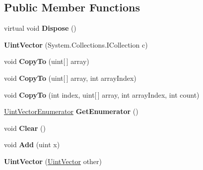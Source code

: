 \subsection*{Public Member Functions}
\begin{DoxyCompactItemize}
\item 
\hypertarget{class_uint_vector_a68c1c1a9371e689f7304576a81c1d51b}{virtual void {\bfseries Dispose} ()}\label{class_uint_vector_a68c1c1a9371e689f7304576a81c1d51b}

\item 
\hypertarget{class_uint_vector_a1abe5eda4417f2b849b5ac9a81bb95e0}{{\bfseries Uint\+Vector} (System.\+Collections.\+I\+Collection c)}\label{class_uint_vector_a1abe5eda4417f2b849b5ac9a81bb95e0}

\item 
\hypertarget{class_uint_vector_a43d50f163e965ea20e0d949afd6c6f13}{void {\bfseries Copy\+To} (uint\mbox{[}$\,$\mbox{]} array)}\label{class_uint_vector_a43d50f163e965ea20e0d949afd6c6f13}

\item 
\hypertarget{class_uint_vector_a68230956cb9e4ad60b4e6890793fb7c0}{void {\bfseries Copy\+To} (uint\mbox{[}$\,$\mbox{]} array, int array\+Index)}\label{class_uint_vector_a68230956cb9e4ad60b4e6890793fb7c0}

\item 
\hypertarget{class_uint_vector_a8ff64e308b47e2a7647bf1c78101501f}{void {\bfseries Copy\+To} (int index, uint\mbox{[}$\,$\mbox{]} array, int array\+Index, int count)}\label{class_uint_vector_a8ff64e308b47e2a7647bf1c78101501f}

\item 
\hypertarget{class_uint_vector_acbeba6945a7c63b750ced2c110ab3f5f}{\hyperlink{class_uint_vector_1_1_uint_vector_enumerator}{Uint\+Vector\+Enumerator} {\bfseries Get\+Enumerator} ()}\label{class_uint_vector_acbeba6945a7c63b750ced2c110ab3f5f}

\item 
\hypertarget{class_uint_vector_ac1e5334e1f51f3f418a66df96b7d8104}{void {\bfseries Clear} ()}\label{class_uint_vector_ac1e5334e1f51f3f418a66df96b7d8104}

\item 
\hypertarget{class_uint_vector_a9074de2af87286ca1d850dbc6e7a5f5a}{void {\bfseries Add} (uint x)}\label{class_uint_vector_a9074de2af87286ca1d850dbc6e7a5f5a}

\item 
\hypertarget{class_uint_vector_afc1cd1b9917c54786411407ab3561c15}{{\bfseries Uint\+Vector} (\hyperlink{class_uint_vector}{Uint\+Vector} other)}\label{class_uint_vector_afc1cd1b9917c54786411407ab3561c15}


\end{DoxyCompactItemize}
